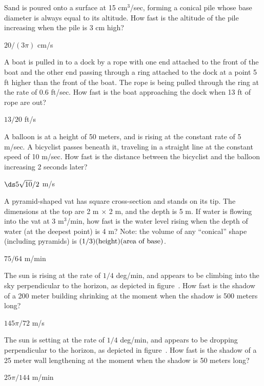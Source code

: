 \begin{exercises}
\exercise Sand is poured onto a surface at 15 cm${}^3$/sec, forming a
conical pile whose base diameter is always equal to its altitude.  How
fast is the altitude of the pile increasing when the pile is 3 cm
high?
\begin{answer} $20/(3\pi)$ cm/s
\end{answer}

\exercise
A boat is pulled in to a dock by a rope with one end attached to the front
of the boat and the other end passing through a ring attached to the dock
at a point 5 ft higher than the front of the boat.  The rope is being
pulled through the ring at the rate of 0.6 ft/sec.  How fast is the boat
approaching the dock when 13 ft of rope are out?
\begin{answer} $13/20$ ft/s
\end{answer}

\exercise
A balloon is at a height of 50 meters, and is rising at the constant rate
of 5 m/sec.  A bicyclist passes beneath it, traveling in a
straight line at the constant speed of 10 m/sec.  How fast is the distance
between the bicyclist and the balloon increasing 2 seconds later?
\begin{answer} $\ds 5\sqrt{10}/2$ m/s
\end{answer}

\exercise A pyramid-shaped vat has square cross-section and stands on its
tip.  The dimensions at the top are 2 m $\times$ 2 m, and the depth is
5 m.  If water is flowing into the vat at 3 m${}^3$/min, how fast is
the water level rising when the depth of water (at the deepest point)
is 4 m?  Note: the volume of any ``conical'' shape (including
pyramids) is $(1/3)(\hbox{height})(\hbox{area of base})$.
\begin{answer} $75/64$ m/min
\end{answer}

\exercise
The sun is rising at the rate of $1/4$ deg/min, and appears to be
climbing into the sky perpendicular to the
horizon, as depicted in figure~.
How fast is the shadow of a 200 meter building
shrinking at the moment when the shadow is 500 meters long? 
\begin{answer} $145\pi/72$ m/s
\end{answer}

\exercise The sun is setting at the rate of $1/4$ deg/min, and appears
to be dropping perpendicular to the horizon, as depicted in
figure~. How fast is the shadow of a 25
meter wall lengthening at the moment when the shadow is 50 meters long?
\begin{answer} $25\pi/144$ m/min
\end{answer}


\end{exercises}
